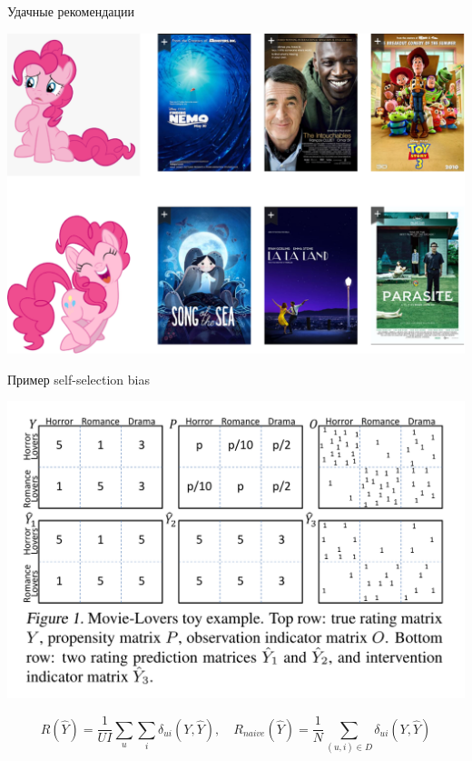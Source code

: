 \documentclass[11pt,aspectratio=169,handout]{beamer}
\begin{document}
\begin{frame}{Удачные рекомендации}

\begin{center}
\includegraphics[scale=0.22]{images/serendipity-pony.png}
\end{center}

\end{frame}

\begin{frame}{Пример self-selection bias}

\begin{center}
\includegraphics[scale=0.3]{images/bias-example.png}
\end{center}

\[
R(\hat Y) = \frac{1}{U I} \sum_u \sum_i \delta_{ui} (Y, \hat Y), \quad R_{naive}(\hat Y) = \frac{1}{N} \sum_{(u,i) \in D} \delta_{ui}(Y, \hat Y)
\]

\end{frame}
\end{document}
